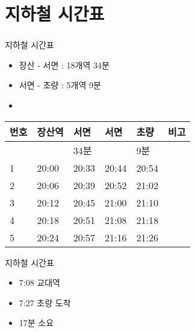 \documentclass[aspectratio=1610,20pt,xcolor=pdftex,dvipsnames,table,handout]{beamer}
\begin{document}
		\section{지하철 시간표}
		\begin{frame} [t,plain]
		\frametitle{}

			\begin{block} {지하철 시간표}
			\setlength{\leftmargini}{2em}			
			\begin{itemize}
				\item  장산 - 서면 : 18개역 34분
				\item  서면 - 초량 : 5개역 9분
				\item 
			\end{itemize}
			\end{block}						


		   \begin{center}
			\label{table:second}
			\setlength{\tabcolsep}{0pt}


			\footnotesize {

		     	\begin{tabularx}{\textwidth}{ 		b{} 
											b{} 
											b{} 
											b{} 
											b{} 
											b{} 
									}\hline

				번호   	& 장산역	& 서면  		&서면 		& 초량	&비고			\\ \hline				\hline				
					   	& 		& 34분 		&		 	& 9분	&				\\ \hline				\hline				

				1   		& 20:00	& 20:33  		&	20:44 	& 20:54		&			\\ \hline
				2   		& 20:06	& 20:39  		&	20:52 	& 21:02		&			\\ \hline
				3   		& 20:12	& 20:45  		&	21:00 	& 21:10		&			\\ \hline
				4   		& 20:18	& 20:51  		&	21:08 	& 21:18		&			\\ \hline
				5   		& 20:24	& 20:57  		&	21:16 	& 21:26		&			\\ \hline
			\end{tabularx}
			}
			\end{center}%


			\begin{block} {지하철 시간표}
			\setlength{\leftmargini}{2em}			
			\begin{itemize}
				\item  7:08 교대역
				\item  7:27 초량 도착
				\item  17분 소요 
			\end{itemize}
			\end{block}						


		\end{frame}						
\end{document}
